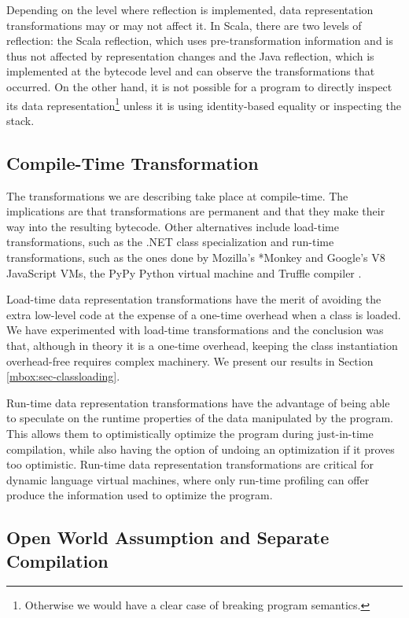Depending on the level where reflection is implemented, data representation transformations may or may not affect it. In Scala, there are two levels of reflection: the Scala reflection, which uses pre-transformation information and is thus not affected by representation changes and the Java reflection, which is implemented at the bytecode level and can observe the transformations that occurred. On the other hand, it is not possible for a program to directly inspect its data representation\footnote{Otherwise we would have a clear case of breaking program semantics.} unless it is using identity-based equality or inspecting the stack.

\subsection{Compile-Time Transformation}

The transformations we are describing take place at compile-time. The implications are that transformations are permanent and that they make their way into the resulting bytecode. Other alternatives include load-time transformations, such as the .NET class specialization \cite{dot-net-generics} and run-time transformations, such as the ones done by Mozilla's *Monkey \cite{tracemonkey} and Google's V8 JavaScript VMs, the PyPy Python virtual machine \cite{bolz-pypy-tracing-jit} and Truffle compiler \cite{truffle}.

Load-time data representation transformations have the merit of avoiding the extra low-level code at the expense of a one-time overhead when a class is loaded. We have experimented with load-time transformations and the conclusion was that, although in theory it is a one-time overhead, keeping the class instantiation overhead-free requires complex machinery. We present our results in Section \ref{mbox:sec-classloading}.

Run-time data representation transformations have the advantage of being able to speculate on the runtime properties of the data manipulated by the program. This allows them to optimistically optimize the program during just-in-time compilation, while also having the option of undoing an optimization if it proves too optimistic. Run-time data representation transformations are critical for dynamic language virtual machines, where only run-time profiling can offer produce the information used to optimize the program.

\subsection{Open World Assumption and Separate Compilation}

